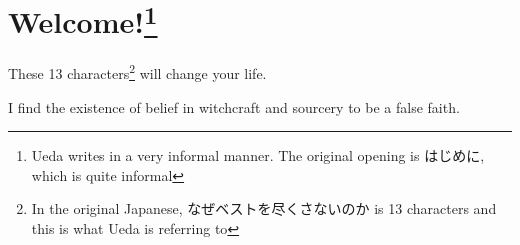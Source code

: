 
\setcounter{footnote}{0}
\chapter*{Welcome!\footnote{Ueda writes in a very informal manner. The original opening is はじめに, which is quite informal}}
\par These 13 characters\footnote {In the original Japanese, なぜベストを尽くさないのか is 13 characters and this is what Ueda is referring to} will change your life.
\par I find the existence of belief in witchcraft and sourcery to be a false faith.
